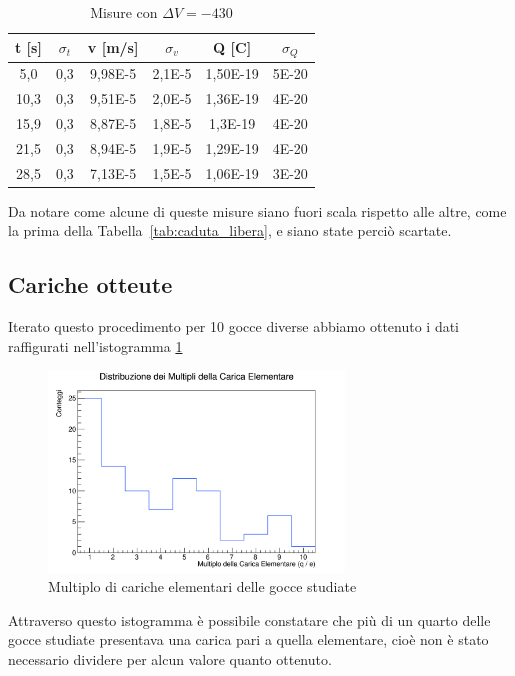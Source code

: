 \documentclass[a4paper,12pt]{article}
\begin{document}
\begin{table}[H]
    \centering
    \caption{Misure con $\Delta V = -430$}
    \label{tab:campo_elettrico_goccia_sale}
    \begin{tabular}{cccccc}
    \toprule
    \textbf{t [s]} & \textbf{$\sigma_t$} & \textbf{v [m/s]} & \textbf{$\sigma_v$} & \textbf{Q [C]} & \textbf{$\sigma_Q$} \\
    \midrule
    5,0 & 0,3 & 9,98E-5 & 2,1E-5 & 1,50E-19 & 5E-20 \\
    10,3 & 0,3 & 9,51E-5 & 2,0E-5 & 1,36E-19 & 4E-20 \\
    15,9 & 0,3 & 8,87E-5 & 1,8E-5 & 1,3E-19 & 4E-20 \\
    21,5 & 0,3 & 8,94E-5 & 1,9E-5 & 1,29E-19 & 4E-20 \\
    28,5 & 0,3 & 7,13E-5 & 1,5E-5 & 1,06E-19 & 3E-20 \\
    \bottomrule
    \end{tabular}
\end{table}

Da notare come alcune di queste misure siano fuori scala rispetto alle altre, come la prima della Tabella~\ref{tab:caduta_libera}, e siano state perciò scartate. 


\subsection{Cariche otteute}
Iterato questo procedimento per 10 gocce diverse abbiamo ottenuto i dati raffigurati nell'istogramma \ref{fig:Istogramma}
\begin{figure}[H]
    \centering
    \includegraphics[width=0.7\textwidth]{Istogramma.png}
    \caption{Multiplo di cariche elementari delle gocce studiate}
    \label{fig:Istogramma}
\end{figure}
Attraverso questo istogramma è possibile constatare che più di un quarto delle gocce studiate presentava una carica pari a quella elementare, cioè non è stato necessario dividere per alcun valore quanto ottenuto.
\end{document}
